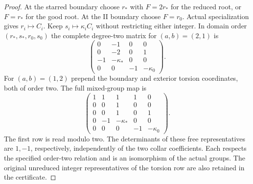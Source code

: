 \begin{proof}
At the starred boundary choose $r_*$ with $F=2r_*$ for the
reduced root, or $F=r_*$ for the good root. At the II boundary
choose $F=r_0$. Actual specialization gives $r_i\mapsto C_i$.
Keep $s_i\mapsto\kappa_i C_i$ without restricting either
integer. In domain order $(r_*,s_*,r_0,s_0)$ the complete
degree-two matrix for $(a,b)=(2,1)$ is
\[
 \begin{pmatrix}
 0&-1&0&0\\0&-2&0&1\\
 -1&-\kappa_*&0&0\\0&0&-1&-\kappa_0
 \end{pmatrix}.                                      \tag{F47.12}
\]
For $(a,b)=(1,2)$ prepend the boundary and exterior torsion
coordinates, both of order two. The full mixed-group map is
\[
 \begin{pmatrix}
 1&1&1&1&0\\0&0&1&0&0\\0&0&1&0&1\\
 0&-1&-\kappa_*&0&0\\0&0&0&-1&-\kappa_0
 \end{pmatrix}.                                      \tag{F47.13}
\]
The first row is read modulo two. The determinants of these
free representatives are $1,-1$, respectively, independently
of the two collar coefficients. Each respects the specified
order-two relation and is an isomorphism of the actual groups.
The original unreduced integer representatives of the torsion
row are also retained in the certificate.


\end{proof}
